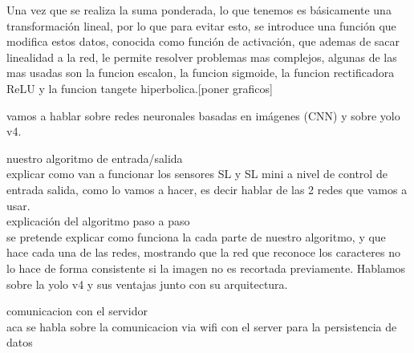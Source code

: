 Una vez que se realiza la suma ponderada, lo que tenemos es básicamente una transformación lineal, por lo que para evitar esto, se introduce una función que modifica estos datos, conocida como función de activación, que ademas de sacar linealidad a la red, le permite resolver problemas mas complejos, algunas de las mas usadas son la funcion escalon, la funcion sigmoide, la funcion rectificadora ReLU y la funcion tangete hiperbolica.[poner graficos]


vamos a hablar sobre redes neuronales basadas en imágenes (CNN) y sobre yolo v4.

nuestro algoritmo de entrada/salida \\

explicar como van a funcionar los sensores SL y SL mini a nivel de control de entrada salida,
como lo vamos a hacer, es decir hablar de las 2 redes que vamos a usar. \\



explicación del algoritmo paso a paso \\

se pretende explicar como funciona la cada parte de nuestro algoritmo, y que hace cada una de las redes, mostrando que la red que reconoce los caracteres no lo hace de forma consistente si la imagen no es recortada previamente. Hablamos sobre la yolo v4 y sus ventajas junto con su arquitectura.

comunicacion con el servidor \\

aca se habla sobre la comunicacion via wifi con el server para la persistencia de datos \\